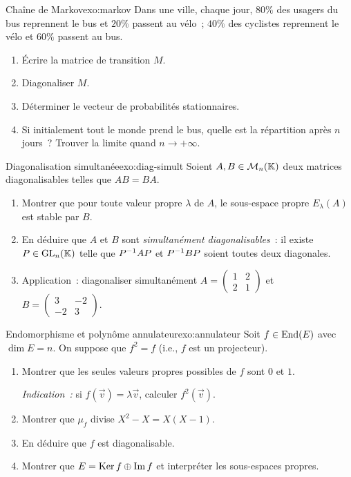 \begin{exercise}{\intermediate{} Chaîne de Markov}{exo:markov}
  Dans une ville, chaque jour, $80\%$ des usagers du bus reprennent le
  bus et $20\%$ passent au vélo~; $40\%$ des cyclistes reprennent le
  vélo et $60\%$ passent au bus.
  \begin{enumerate}[label=(\alph*)]
    \item Écrire la matrice de transition $M$.
    \item Diagonaliser $M$.
    \item Déterminer le vecteur de probabilités stationnaires.
    \item Si initialement tout le monde prend le bus, quelle est la
      répartition après $n$ jours~? Trouver la limite quand
      $n\to+\infty$.
  \end{enumerate}
\end{exercise}

\begin{exercise}{\challenging{} Diagonalisation simultanée}{exo:diag-simult}
  Soient $A,B\in\mathcal{M}_n({\mathbb{K}})$ deux matrices diagonalisables telles que
  $AB=BA$.
  \begin{enumerate}[label=(\alph*)]
    \item Montrer que pour toute valeur propre $\lambda$ de $A$, le
      sous-espace propre $E_\lambda(A)$ est stable par $B$.
    \item En déduire que $A$ et $B$ sont \emph{simultanément
      diagonalisables}~: il existe $P\in\operatorname{GL}_n({\mathbb{K}})$ telle que
      ${P}^{-1}AP$ et ${P}^{-1}BP$ soient toutes deux diagonales.
    \item Application~: diagonaliser simultanément
      $A=\begin{pmatrix}1&2\\2&1\end{pmatrix}$ et
      $B=\begin{pmatrix}3&-2\\-2&3\end{pmatrix}$.
  \end{enumerate}
\end{exercise}

\begin{exercise}{\challenging{} Endomorphisme et polynôme annulateur}{exo:annulateur}
  Soit $f\in\operatorname{End}(E)$ avec $\dim E=n$. On suppose que $f^2=f$ (i.e.,
  $f$ est un projecteur).
  \begin{enumerate}[label=(\alph*)]
    \item Montrer que les seules valeurs propres possibles de $f$
      sont $0$ et $1$.

      \emph{Indication~:} si $f(\vec{v})=\lambda\vec{v}$, calculer
      $f^2(\vec{v})$.
    \item Montrer que $\mu_f$ divise $X^2-X=X(X-1)$.
    \item En déduire que $f$ est diagonalisable.
    \item Montrer que $E=\operatorname{Ker} f\oplus\operatorname{Im} f$ et interpréter les
      sous-espaces propres.
  \end{enumerate}
\end{exercise}

